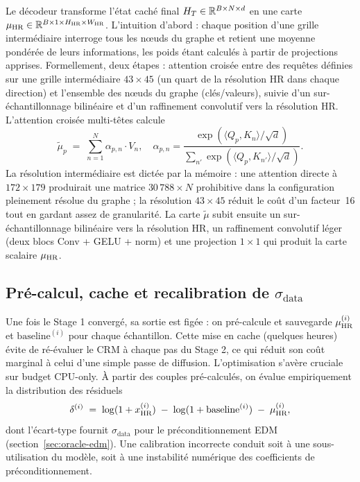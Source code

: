 Le décodeur transforme l'état caché final $H_T \in \mathbb{R}^{B \times N \times d}$ en une carte $\mu_{\text{HR}} \in \mathbb{R}^{B \times 1 \times H_{\text{HR}} \times W_{\text{HR}}}$. L'intuition d'abord : chaque position d'une grille intermédiaire interroge tous les nœuds du graphe et retient une moyenne pondérée de leurs informations, les poids étant calculés à partir de projections apprises. Formellement, deux étapes : attention croisée entre des requêtes définies sur une grille intermédiaire $43 \times 45$ (un quart de la résolution HR dans chaque direction) et l'ensemble des nœuds du graphe (clés/valeurs), suivie d'un sur-échantillonnage bilinéaire et d'un raffinement convolutif vers la résolution HR. L'attention croisée multi-têtes calcule
\begin{equation}
  \tilde{\mu}_p \;=\; \sum_{n=1}^{N} \alpha_{p,n} \cdot V_n,
  \quad
  \alpha_{p,n} = \frac{\exp\!\left( \langle Q_p, K_n \rangle / \sqrt{d} \right)}{\sum_{n'} \exp\!\left( \langle Q_p, K_{n'} \rangle / \sqrt{d} \right)}.
  \label{eq:cross-attention}
\end{equation}
La résolution intermédiaire est dictée par la mémoire : une attention directe à $172 \times 179$ produirait une matrice $30\,788 \times N$ prohibitive dans la configuration pleinement résolue du graphe ; la résolution $43 \times 45$ réduit le coût d'un facteur~16 tout en gardant assez de granularité. La carte $\tilde{\mu}$ subit ensuite un sur-échantillonnage bilinéaire vers la résolution HR, un raffinement convolutif léger (deux blocs Conv + GELU + norm) et une projection $1 \times 1$ qui produit la carte scalaire $\mu_{\text{HR}}$.

\label{sec:oracle-o3}

\subsection{Pré-calcul, cache et recalibration de $\sigma_{\mathrm{data}}$}
\label{ssec:oracle-cache}

Une fois le Stage 1 convergé, sa sortie est figée : on pré-calcule et sauvegarde $\mu_{\text{HR}}^{(i)}$ et $\mathrm{baseline}^{(i)}$ pour chaque échantillon. Cette mise en cache (quelques heures) évite de ré-évaluer le CRM à chaque pas du Stage 2, ce qui réduit son coût marginal à celui d'une simple passe de diffusion. L'optimisation s'avère cruciale sur budget CPU-only. À partir des couples pré-calculés, on évalue empiriquement la distribution des résiduels
\begin{equation}
  \delta^{(i)} \;=\; \log(1 + x_{\text{HR}}^{(i)}) \;-\; \log(1 + \mathrm{baseline}^{(i)}) \;-\; \mu_{\text{HR}}^{(i)},
  \label{eq:residu}
\end{equation}
dont l'écart-type fournit $\sigma_{\mathrm{data}}$ pour le préconditionnement EDM (section~\ref{sec:oracle-edm}). Une calibration incorrecte conduit soit à une sous-utilisation du modèle, soit à une instabilité numérique des coefficients de préconditionnement.

